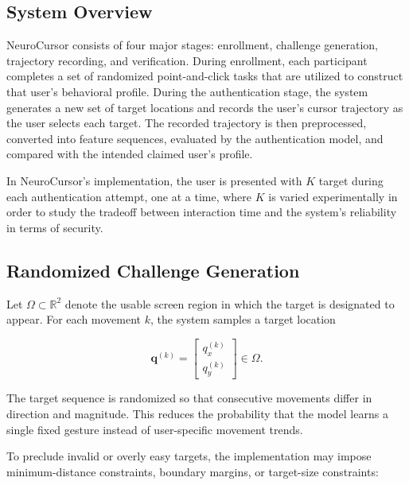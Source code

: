 \documentclass[conference]{IEEEtran}
\begin{document}
\subsection{System Overview}
NeuroCursor consists of four major stages: enrollment, challenge generation, trajectory recording, and verification. During enrollment, each participant completes a set of randomized point-and-click tasks that are utilized to construct that user's behavioral profile. During the authentication stage, the system generates a new set of target locations and records the user's cursor trajectory as the user selects each target. The recorded trajectory is then preprocessed, converted into feature sequences, evaluated by the authentication model, and compared with the intended claimed user's profile. 


In NeuroCursor's implementation, the user is presented with $K$ target during each authentication attempt, one at a time, where $K$ is varied experimentally in order to study the tradeoff between interaction time and the system's reliability in terms of security.

\subsection{Randomized Challenge Generation}

Let $\Omega \subset \mathbb{R}^2$ denote the usable screen region in which the target is designated to appear. For each movement $k$, the system samples a target location 

\begin{equation}
\mathbf{q}^{(k)}
=
\begin{bmatrix}
q_x^{(k)}\\
q_y^{(k)}
\end{bmatrix}
\in \Omega.
\label{eq:target_location}
\end{equation}

The target sequence is randomized so that consecutive movements differ in direction and magnitude. This reduces the probability that the model learns a single fixed gesture instead of user-specific movement trends. 


To preclude invalid or overly easy targets, the implementation may impose minimum-distance constraints, boundary margins, or target-size constraints:
\end{document}
